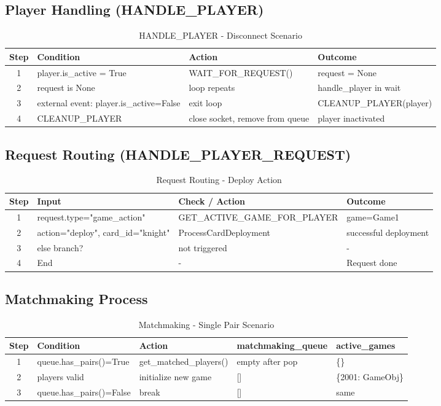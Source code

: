 \documentclass{article}
\begin{document}
\subsection{Player Handling (HANDLE\_PLAYER)}
\begin{table}[H]
\centering
\footnotesize
\begin{tabular}{|c|l|l|l|}
\hline
\textbf{Step} & \textbf{Condition} & \textbf{Action} & \textbf{Outcome}\\
\hline
1 & player.is\_active = True & WAIT\_FOR\_REQUEST() & request = None \\
\hline
2 & request is None & loop repeats & handle\_player in wait \\
\hline
3 & external event: player.is\_active=False & exit loop & CLEANUP\_PLAYER(player) \\
\hline
4 & CLEANUP\_PLAYER & close socket, remove from queue & player inactivated \\
\hline
\end{tabular}
\caption{HANDLE\_PLAYER - Disconnect Scenario}
\end{table}

\subsection{Request Routing (HANDLE\_PLAYER\_REQUEST)}
\begin{table}[H]
\centering
\footnotesize
\begin{tabular}{|c|l|l|l|}
\hline
\textbf{Step} & \textbf{Input} & \textbf{Check / Action} & \textbf{Outcome}\\
\hline
1 & request.type="game\_action" & GET\_ACTIVE\_GAME\_FOR\_PLAYER & game=Game1 \\
\hline
2 & action="deploy", card\_id="knight" & ProcessCardDeployment & successful deployment \\
\hline
3 & else branch? & not triggered & - \\
\hline
4 & End & - & Request done \\
\hline
\end{tabular}
\caption{Request Routing - Deploy Action}
\end{table}

\subsection{Matchmaking Process}
\begin{table}[H]
\centering
\footnotesize
\begin{tabular}{|c|l|l|l|l|}
\hline
\textbf{Step} & \textbf{Condition} & \textbf{Action} & \textbf{matchmaking\_queue} & \textbf{active\_games} \\
\hline
1 & queue.has\_pairs()=True & get\_matched\_players() & empty after pop & \{\} \\
\hline
2 & players valid & initialize new game & [] & \{2001: GameObj\} \\
\hline
3 & queue.has\_pairs()=False & break & [] & same \\
\hline
\end{tabular}
\caption{Matchmaking - Single Pair Scenario}
\end{table}
\end{document}
